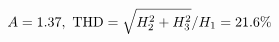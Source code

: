 \documentclass[preview]{standalone}
\begin{document}
\begin{align*}
\special{dvisvgm:raw <g id='unique000'>}A=1.37,\ \text{THD}=\sqrt{H_2^2+H_3^2}/H_1=21.6\%\special{dvisvgm:raw </g>}
\end{align*}
\end{document}
